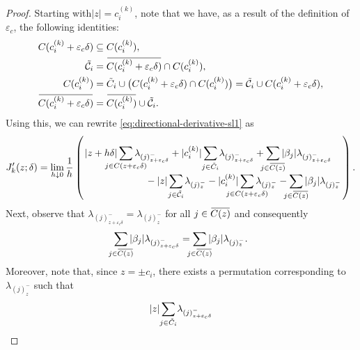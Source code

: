 \begin{proof}
  Starting with\(|z| = c_i^{(k)}\), note that we have,
  as a result of the definition of
  \({\varepsilon_c}\), the following identities:
  \begin{align*}
    C(c_i^{(k)} + {\varepsilon_c}\delta)            & \subseteq C(c_i^{(k)}),                                                                                                                                 \\
    \tilde{\mathcal{C}}_i                           & = \widebar{C(c_i^{(k)} + {\varepsilon_c} \delta)} \cap C(c_i^{(k)}),                                                                                    \\
    C(c_i^{(k)})                                    & = \tilde{C}_i \cup \big(C(c_i^{(k)} + {\varepsilon_c}\delta) \cap C(c_i^{(k)})\big) = \tilde{\mathcal{C}}_i \cup C(c_i^{(k)} + {\varepsilon_c} \delta), \\
    \widebar{C(c_i^{(k)} + {\varepsilon_c} \delta)} & = \widebar{C(c_i^{(k)})} \cup \tilde{\mathcal{C}}_i.
  \end{align*}
  Using this, we can rewrite \eqref{eq:directional-derivative-sl1} as
  \begin{equation*}
    \label{eq:directional-derivative-simplified}
    J'_k(z; \delta)
    = \lim_{h \downarrow 0} \frac{1}{h}
    \left(
      \splitfrac{
      |z + h\delta|\smashoperator{\sum_{j \in C(z + {\varepsilon_c}\delta)}} \lambda_{(j)^-_{z + {\varepsilon_c}\delta}}
      + |c_i^{(k)}|\smashoperator{\sum_{j \in \tilde{C}_i}} \lambda_{(j)^-_{z + {\varepsilon_c}\delta}}
      + \smashoperator{\sum_{j \in \widebar{C(z)}}} |\beta_j|\lambda_{(j)^-_{z + {\varepsilon_c}\delta}}
      }{%
      - |z| \smashoperator{\sum_{j \in \tilde{\mathcal{C}}_i}} \lambda_{(j)^-_{z}}
      - |c_i^{(k)}| \smashoperator{\sum_{j \in C(z + {\varepsilon_c}\delta)}} \lambda_{(j)^-_{z}}
      - \smashoperator{\sum_{j \in \widebar{C(z)}}} |\beta_j| \lambda_{(j)^-_{z}}
      }
    \right).
  \end{equation*}
  Next, observe that \(\lambda_{(j)^-_{z + {\varepsilon_c}\delta}} =
  \lambda_{(j)^-_{z}}\) for all \(j \in \widebar{C(z)}\) and consequently
  \[
    \smashoperator{\sum_{j \in \widebar{C(z)}}} |\beta_j|\lambda_{(j)^-_{z + {\varepsilon_c}\delta}} =
    \smashoperator{\sum_{j \in \widebar{C(z)}}} |\beta_j|\lambda_{(j)^-_{z}}.
  \]
  Moreover, note that, since \(z = \pm c_i\), there exists a permutation corresponding to
  \(\lambda_{(j)^-_{z}}\) such that
  \[
    |z|\smashoperator{\sum_{j \in \tilde{C}_i}} \lambda_{(j)^-_{z + {\varepsilon_c}\delta}}
\]
\end{proof}
